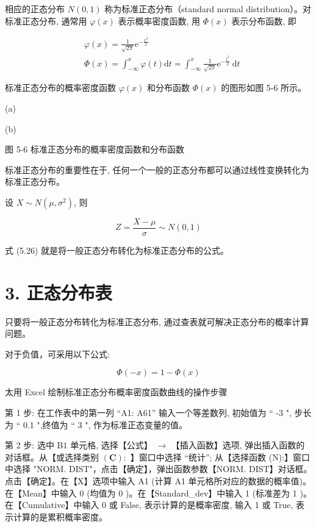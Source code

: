 \documentclass[10pt]{article}
\begin{document}
\begin{CJK*}{UTF8}{bsmi}
相应的正态分布 $N(0,1)$ 称为标准正态分布（standard normal distribution）。对标准正态分布, 通常用 $\varphi(x)$ 表示概率密度函数, 用 $\Phi(x)$ 表示分布函数, 即


\begin{align*}
& \varphi(x)=\frac{1}{\sqrt{2 \pi}} \mathrm{e}^{-\frac{x^{2}}{2}}  \tag{5.24}\\
& \Phi(x)=\int_{-\infty}^{x} \varphi(t) \mathrm{d} t=\int_{-\infty}^{x} \frac{1}{\sqrt{2 \pi}} \mathrm{e}^{-\frac{t^{2}}{2}} \mathrm{~d} t \tag{5.25}
\end{align*}


标准正态分布的概率密度函数 $\varphi(x)$ 和分布函数 $\Phi(x)$ 的图形如图 5-6 所示。

\begin{center}
\end{center}

(a)

\begin{center}
\end{center}

(b)

图 5-6 标准正态分布的概率密度函数和分布函数

标准正态分布的重要性在于, 任何一个一般的正态分布都可以通过线性变换转化为标准正态分布。

设 $X \sim N\left(\mu, \sigma^{2}\right)$, 则


\begin{equation*}
Z=\frac{X-\mu}{\sigma} \sim N(0,1) \tag{5.26}
\end{equation*}


式 (5.26) 就是将一般正态分布转化为标准正态分布的公式。

\section*{3. 正态分布表}
只要将一般正态分布转化为标准正态分布, 通过查表就可解决正态分布的概率计算问题。

对于负值，可采用以下公式:


\begin{equation*}
\Phi(-x)=1-\Phi(x) \tag{5.27}
\end{equation*}


太用 Excel 绘制标准正态分布概率密度函数曲线的操作步骤

第 1 步: 在工作表中的第一列 “A1: A61” 输入一个等差数列, 初始值为 “ -3 ", 步长为 “ 0.1 ",终值为 “ 3 ", 作为标准正态变量的值。

第 2 步: 选中 $\mathrm{B} 1$ 单元格, 选择【公式】 $\rightarrow$ 【插入函数】选项, 弹出插入函数的对话框。从【或选择类别 $(\underline{\mathbf{C}}):$ 】窗口中选择 “统计”; 从【选择函数 (N):】窗口中选择 "NORM. DIST"，点击【确定】，弹出函数参数【NORM. DIST】对话框。点击【确定】。在【X】选项中输入 A1 (计算 A1 单元格所对应的数据的概率值)。在【Mean】中输入 0 (均值为 0 )。在【Standard\_dev】中输入 1 (标准差为 1 )。在【Cumulative】中输入 0 或 False, 表示计算的是概率密度, 输入 1 或 True, 表示计算的是累积概率密度。


\end{CJK*}
\end{document}
